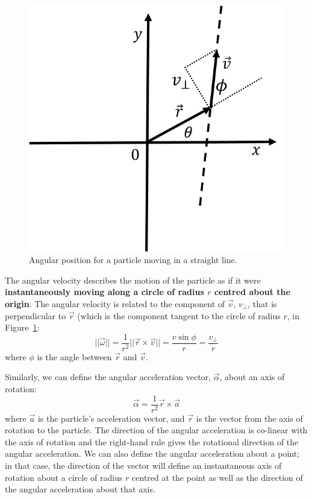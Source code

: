 \begin{figure}[!htbp]
\centering
\includegraphics[width=0.375\linewidth]{files/vline-dade52a6a4387571d252280093213e03.png}
\caption[]{Angular position for a particle moving in a straight line.}
\label{fig_rotationaldynamics_vline}
\end{figure}

The angular velocity describes the motion of the particle as if it were \textbf{instantaneously moving along a circle of radius $r$ centred about the origin}. The angular velocity is related to the component of $\vec v$, $v_\perp$, that is perpendicular to $\vec r$ (which is the component tangent to the circle of radius $r$, in Figure~\ref{fig_rotationaldynamics_vline}:
\begin{equation}
||\vec \omega|| = \frac{1}{r^2} || \vec r \times \vec v||=\frac{v\sin\phi}{r}= \frac{v_\perp}{r}
\end{equation}
where $\phi$ is the angle between $\vec r$ and $\vec v$.

Similarly, we can define the angular acceleration vector, $\vec \alpha$, about an axis of rotation:
\begin{equation}
\vec \alpha = \frac{1}{r^2}\vec r \times \vec a
\end{equation}
where $\vec a$ is the particle's acceleration vector,  and $\vec r$ is the vector from the axis of rotation to the particle. The direction of the angular acceleration is co-linear with the axis of rotation and the right-hand rule gives the rotational direction of the angular acceleration. We can also define the angular acceleration about a point; in that case, the direction of the vector will define an instantaneous axis of rotation about a circle of radius $r$ centred at the point as well as the direction of the angular acceleration about that axis.


